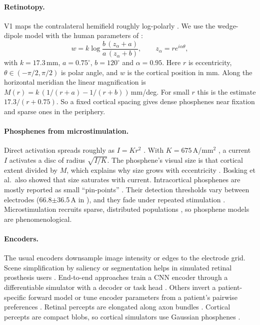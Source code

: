 \paragraph{Retinotopy.} V1 maps the contralateral hemifield roughly log-polarly \citep{schwartz1977spatial}. We use the wedge-dipole model \citep{polimeni2006multi} with the human parameters of \citet{vandergrinten2024towards}:
\begin{equation}
  w = k\log\frac{b\,(z_\alpha + a)}{a\,(z_\alpha + b)},\qquad z_\alpha = r e^{i\alpha\theta},
  \label{eq:wedge}
\end{equation}
with $k{=}17.3$\,mm, $a{=}0.75^\circ$, $b{=}120^\circ$ and $\alpha{=}0.95$. Here $r$ is eccentricity, $\theta\in(-\pi/2,\pi/2)$ is polar angle, and $w$ is the cortical position in mm. Along the horizontal meridian the linear magnification is $M(r)=k\,(1/(r{+}a)-1/(r{+}b))$\,mm/deg. For small $r$ this is the \citet{horton1991representation} estimate $17.3/(r+0.75)$. So a fixed cortical spacing gives dense phosphenes near fixation and sparse ones in the periphery.

\paragraph{Phosphenes from microstimulation.} Direct activation spreads roughly as $I=Kr^2$ \citep{tehovnik1996electrical}. With $K{=}675$\,\textmu A/mm$^2$ \citep{tehovnik2006direct,tehovnik2007phosphene}, a current $I$ activates a disc of radius $\sqrt{I/K}$. The phosphene's visual size is that cortical extent divided by $M$, which explains why size grows with eccentricity \citep{winawer2016linking,bosking2017saturation}. Bosking et al.\ also showed that size saturates with current. Intracortical phosphenes are mostly reported as small ``pin-points'' \citep{schmidt1996feasibility,fernandez2021visual}. Their detection thresholds vary between electrodes (66.8$\pm$36.5\,\textmu A in \citealp{fernandez2021visual}), and they fade under repeated stimulation \citep{schmidt1996feasibility}. Microstimulation recruits sparse, distributed populations \citep{histed2009direct}, so phosphene models are phenomenological.

\paragraph{Encoders.} The usual encoders downsample image intensity or edges to the electrode grid. Scene simplification by saliency or segmentation helps in simulated retinal prosthesis users \citep{han2021deep}. End-to-end approaches train a CNN encoder through a differentiable simulator with a decoder or task head \citep{deruyter2022end,kucukoglu2022optimization}. Others invert a patient-specific forward model \citep{granley2022hybrid} or tune encoder parameters from a patient's pairwise preferences \citep{granley2023human}. Retinal percepts are elongated along axon bundles \citep{beyeler2019model}. Cortical percepts are compact blobs, so cortical simulators use Gaussian phosphenes \citep{vandergrinten2024towards}.

